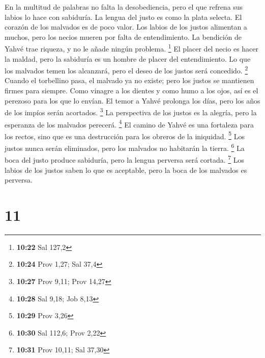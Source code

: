  En la multitud de palabras no falta la desobediencia,
pero el que refrena sus labios lo hace con sabiduría.  La
lengua del justo es como la plata selecta. El corazón de los malvados es
de poco valor.  Los labios de los justos alimentan a
muchos, pero los necios mueren por falta de entendimiento.
 La bendición de Yahvé trae riqueza, y no le añade ningún
problema. \footnote{\textbf{10:22} Sal 127,2}  El placer
del necio es hacer la maldad, pero la sabiduría es un hombre de placer
del entendimiento.  Lo que los malvados temen los
alcanzará, pero el deseo de los justos será concedido. \footnote{\textbf{10:24}
  Prov 1,27; Sal 37,4}  Cuando el torbellino pasa, el
malvado ya no existe; pero los justos se mantienen firmes para siempre.
 Como vinagre a los dientes y como humo a los ojos, así
es el perezoso para los que lo envían.  El temor a Yahvé
prolonga los días, pero los años de los impíos serán acortados.
\footnote{\textbf{10:27} Prov 9,11; Prov 14,27}  La
perspectiva de los justos es la alegría, pero la esperanza de los
malvados perecerá. \footnote{\textbf{10:28} Sal 9,18; Job 8,13}
 El camino de Yahvé es una fortaleza para los rectos,
sino que es una destrucción para los obreros de la iniquidad.
\footnote{\textbf{10:29} Prov 3,26}  Los justos nunca
serán eliminados, pero los malvados no habitarán la tierra. \footnote{\textbf{10:30}
  Sal 112,6; Prov 2,22}  La boca del justo produce
sabiduría, pero la lengua perversa será cortada. \footnote{\textbf{10:31}
  Prov 10,11; Sal 37,30}  Los labios de los justos saben
lo que es aceptable, pero la boca de los malvados es perversa.

\hypertarget{section-10}{%
\section{11}\label{section-10}}

